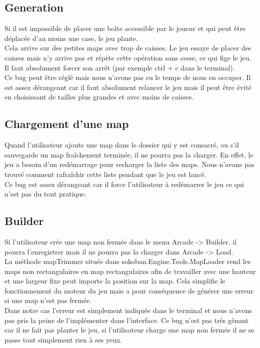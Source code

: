 \documentclass[../main.tex]{subfiles}
\begin{document}
\subsection{Generation}
Si il est impossible de placer une boîte accessible par le joueur et qui peut être déplacée d'au moins une case, le jeu plante. \\

Cela arrive sur des petites maps avec trop de caisses. Le jeu essaye de placer des caisses mais n'y arrive pas et répète cette opération sans cesse, ce qui fige le jeu. Il faut absolument forcer son arrêt (par exemple ctrl + c dans le terminal). \\

Ce bug peut être réglé mais nous n’avons pas eu le temps de nous en occuper. Il est assez dérangeant car il faut absolument relancer le jeu mais il peut être évité en choisissant de tailles plus grandes et avec moins de caisses.

\subsection{Chargement d'une map}
Quand l’utilisateur ajoute une map dans le dossier qui y est consacré, ou s'il sauvegarde un map fraîchement terminée, il ne pourra pas la charger.
En effet, le jeu a besoin d’un redémarrage pour recharger la liste des maps. Nous n’avons pas trouvé comment rafraîchir cette liste pendant que le jeu est lancé. \\ 

Ce bug est assez dérangeant car il force l’utilisateur à redémarrer le jeu ce qui n’est pas du tout pratique.

\subsection{Builder}
Si l’utilisateur crée une map non fermée dans le menu Arcade -> Builder, il pourra l’enregistrer mais il ne pourra pas la charger dans Arcade -> Load. \\
La méthode mapTrimmer située dans sokoban.Engine.Tools.MapLoader rend les maps non rectangulaires en map rectangulaires afin de travailler avec une hauteur et une largeur fixe peut importe la position sur la map. Cela simplifie le fonctionnement du moteur du jeu mais a pour conséquence de générer une erreur si une map n’est pas fermée. \\

Dans notre cas l’erreur est simplement indiquée dans le terminal et nous n’avons pas pris la peine de l'implémenter dans l’interface. Ce bug n’est pas très gênant car il ne fait pas planter le jeu, si l’utilisateur charge une map non fermée il ne se passe tout simplement rien à ses yeux.
\end{document}
